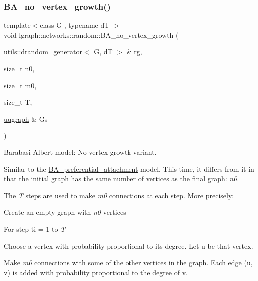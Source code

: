 \subsubsection{\texorpdfstring{B\+A\+\_\+no\+\_\+vertex\+\_\+growth()}{BA\_no\_vertex\_growth()}}
{\footnotesize\ttfamily template$<$class G , typename dT $>$ \\
void lgraph\+::networks\+::random\+::\+B\+A\+\_\+no\+\_\+vertex\+\_\+growth (\begin{DoxyParamCaption}\item[{\hyperlink{classlgraph_1_1utils_1_1drandom__generator}{utils\+::drandom\+\_\+generator}$<$ G, dT $>$ \&}]{rg,  }\item[{size\+\_\+t}]{n0,  }\item[{size\+\_\+t}]{m0,  }\item[{size\+\_\+t}]{T,  }\item[{\hyperlink{classlgraph_1_1uugraph}{uugraph} \&}]{Gs }\end{DoxyParamCaption})}



Barabasi-\/\+Albert model\+: No vertex growth variant. 

Similar to the \hyperlink{namespacelgraph_1_1networks_1_1random_adbb7aa72c5ebdd0dc0227e0e403b6707}{B\+A\+\_\+preferential\+\_\+attachment} model. This time, it differs from it in that the initial graph has the same number of vertices as the final graph\+: {\itshape n0}.

The {\itshape T} steps are used to make {\itshape m0} connections at each step. More precisely\+:
\begin{DoxyItemize}
\item Create an empty graph with {\itshape n0} vertices
\item For step ti = 1 to {\itshape T} 
\begin{DoxyItemize}
\item Choose a vertex with probability proportional to its degree. Let u be that vertex.
\item Make {\itshape m0} connections with some of the other vertices in the graph. Each edge (u, v) is added with probability proportional to the degree of v.
\end{DoxyItemize}
\end{DoxyItemize}


